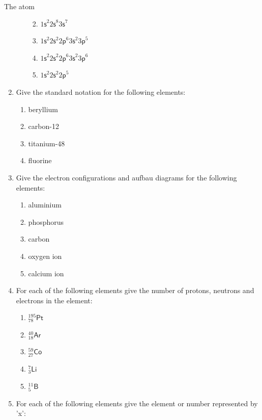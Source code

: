 \begin{eocexercises}{The atom}
\begin{enumerate}[noitemsep, label=\textbf{\arabic*}. ]
\begin{enumerate}[noitemsep, label=\textbf{\alph*}. ]
\begin{enumerate}[noitemsep, label=\textbf{\alph*}. ]
            \label{m38741*uid218}\item  ${1\mathsf{s}}^{2}{2\mathsf{s}}^{8}{3\mathsf{s}}^{7}$\label{m38741*uid219}\item 
${1\mathsf{s}}^{2}{2\mathsf{s}}^{2}{2\mathsf{p}}^{6}{3\mathsf{s}}^{2}{3\mathsf{p}}^{5}$
\label{m38741*uid220}\item 
${1\mathsf{s}}^{2}{2\mathsf{s}}^{2}{2\mathsf{p}}^{6}{3\mathsf{s}}^{2}{3\mathsf{p}}^{6}$\label{m38741*uid221}\item 
${1\mathsf{s}}^{2}{2\mathsf{s}}^{2}{2\mathsf{p}}^{5}$\end{enumerate}
                \end{enumerate}
        \item Give the standard notation for the following elements:
\label{m38741*id8223}\begin{enumerate}[noitemsep, label=\textbf{\alph*}. ] 
            \item beryllium
\item carbon-12
\item titanium-48
\item fluorine
\end{enumerate}
\item Give the electron configurations and aufbau diagrams for the following elements:\label{m38741*id7624}\begin{enumerate}[noitemsep, label=\textbf{\alph*}. ] 
            \item aluminium
\item phosphorus
\item carbon
\item oxygen ion
\item calcium ion
\end{enumerate}
\item For each of the following elements give the number of protons, neutrons and electrons in the element: \label{m38741*id74374}\begin{enumerate}[noitemsep, label=\textbf{\alph*}. ] 
            \item $_{78}^{195}\mathsf{Pt}$
\item $_{18}^{40}\mathsf{Ar}$
\item $_{27}^{59}\mathsf{Co}$
\item $_{3}^{7}\mathsf{Li}$
\item $_{5}^{11}\mathsf{B}$
\end{enumerate}
\item For each of the following elements give the element or number represented by 'x': \label{m38741*id7434324}\begin{enumerate}[noitemsep, label=\textbf{\alph*}. ] 

\end{enumerate}
\end{enumerate}
\end{eocexercises}
